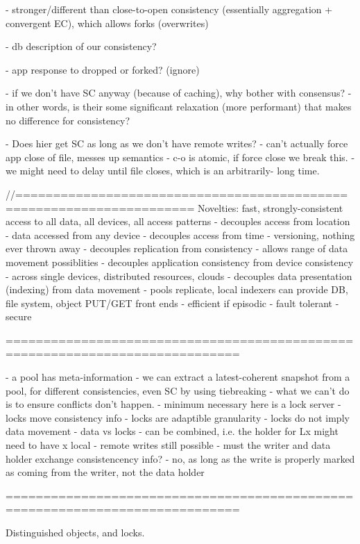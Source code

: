 - stronger/different than close-to-open consistency (essentially aggregation + convergent EC), which allows forks (overwrites)

- db description of our consistency?

- app response to dropped or forked?  (ignore)

- if we don't have SC anyway (because of caching), why bother with consensus?
  - in other words, is their some significant relaxation (more
    performant) that makes no difference for consistency?

- Does hier get SC as long as we don't have remote writes?
  - can't actually force app close of file, messes up semantics
    - c-o is atomic, if force close we break this.
  - we might need to delay until file closes, which is an arbitrarily- long time.

//=====================================================================
Novelties: fast, strongly-consistent access to all data, all devices, all access patterns
- decouples access from location
  - data accessed from any device
- decouples access from time
  - versioning, nothing ever thrown away
- decouples replication from consistency 
  - allows range of data movement possiblities
- decouples application consistency from device consistency
  - across single devices, distributed resources, clouds
- decouples data presentation (indexing) from data movement
  - pools replicate, local indexers can provide DB, file system,
    object PUT/GET front ends
  - efficient if episodic
- fault tolerant
- secure


=============================================================================

- a pool has meta-information
- we can extract a latest-coherent snapshot from a pool, for different consistencies, even SC by using tiebreaking
  - what we can't do is to ensure conflicts don't happen.
  - minimum necessary here is a lock server
    - locks move consistency info
    - locks are adaptible granularity
    - locks do not imply data movement
    - data vs locks
      - can be combined, i.e. the holder for Lx might need to have x local
      - remote writes still possible
      - must the writer and data holder exchange consistencency info?  
        - no, as long as the write is properly marked as coming from the  writer, not the data holder


=============================================================================

Distinguished objects, and locks.

